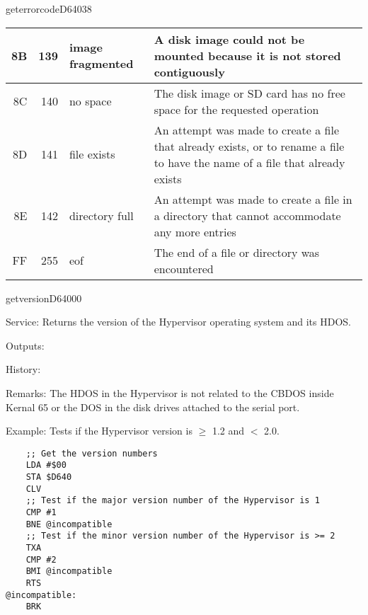 \begin{hyppotrap}{geterrorcode}{D640}{38}
{\begin{longtable}{|r|r|l|p{8cm}|}
    8B & 139 & image fragmented &
    A disk image could not be mounted because it is not stored contiguously
    \\\hline
    8C & 140 & no space &
    The disk image or SD card has no free space for the requested operation
    \\\hline
    8D & 141 & file exists &
    An attempt was made to create a file that already exists, or to rename a
    file to have the name of a file that already exists
    \\\hline
    8E & 142 & directory full &
    An attempt was made to create a file in a directory that cannot accommodate
    any more entries
    \\\hline
    FF & 255 & eof &
    The end of a file or directory was encountered
    \\\hline
  \end{longtable}
}
\end{hyppotrap}


\newpage
\begin{hyppotrap}{getversion}{D640}{00}
\item [Service:]
  Returns the version of the Hypervisor operating system and its HDOS.
\item [Outputs:]
\item [History:]
\item [Remarks:]
  The HDOS in the Hypervisor is not related to the CBDOS inside Kernal 65 or the
  DOS in the disk drives attached to the serial port.
\item [Example:]
  Tests if the Hypervisor version is $\geq$ 1.2 and $<$ 2.0.
\begin{tcolorbox}[colback=black,coltext=white]
\verbatimfont{\codefont}
\begin{verbatim}
    ;; Get the version numbers
    LDA #$00
    STA $D640
    CLV
    ;; Test if the major version number of the Hypervisor is 1
    CMP #1
    BNE @incompatible
    ;; Test if the minor version number of the Hypervisor is >= 2
    TXA
    CMP #2
    BMI @incompatible
    RTS
@incompatible:
    BRK
\end{verbatim}
\end{tcolorbox}
\end{hyppotrap}


